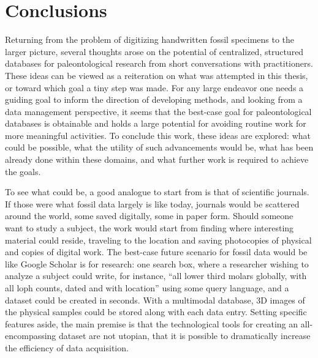 \documentclass[english,twoside,openright]{UH_DS_MSc}
\begin{document}
\chapter{Conclusions}

Returning from the problem of digitizing handwritten fossil specimens to the larger picture, several thoughts arose on the potential of centralized, structured databases for paleontological research from short conversations with practitioners.
These ideas can be viewed as a reiteration on what was attempted in this thesis, or toward which goal a tiny step was made. For any large endeavor one needs a guiding goal to inform the direction of developing methods, and looking from a data management perspective, it seems that the best-case goal for paleontological databases is obtainable and holds a large potential for avoiding routine work for more meaningful activities. To conclude this work, these ideas are explored: what could be possible, what the utility of such advancements would be, what has been already done within these domains, and what further work is required to achieve the goals.

To see what could be, a good analogue to start from is that of scientific journals. If those were what fossil data largely is like today, journals would be scattered around the world, some saved digitally, some in paper form. Should someone want to study a subject, the work would start from finding where interesting material could reside, traveling to the location and saving photocopies of physical and copies of digital work. The best-case future scenario for fossil data would be like Google Scholar is for research: one search box, where a researcher wishing to analyze a subject could write, for instance, ``all lower third molars globally, with all loph counts, dated and with location'' using some query language, and a dataset could be created in seconds. With a multimodal database, 3D images of the physical samples could be stored along with each data entry. Setting specific features aside, the main premise is that the technological tools for creating an all-encompassing dataset are not utopian, that it is possible to dramatically increase the efficiency of data acquisition.
\end{document}
